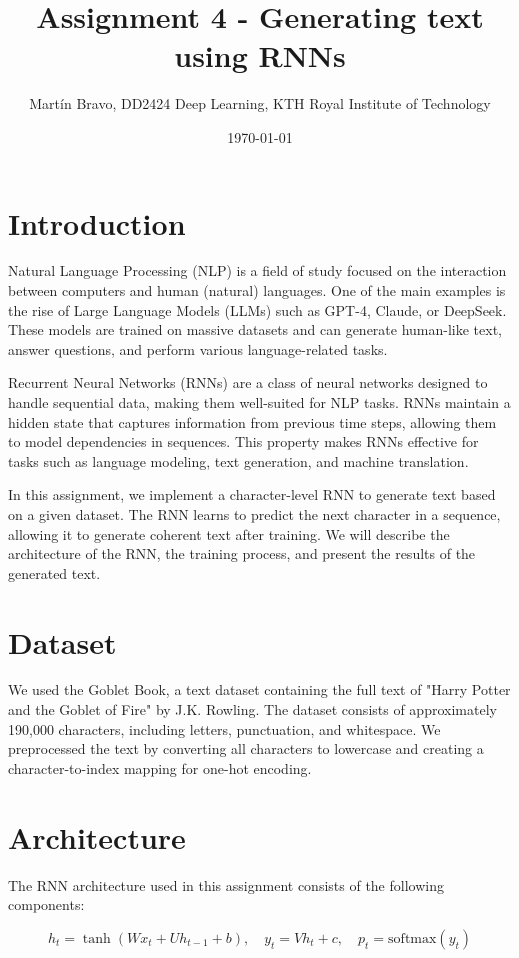 \documentclass{article}
\title{Assignment 4 - Generating text using RNNs}
\author{Martín Bravo, DD2424 Deep Learning, KTH Royal Institute of Technology}
\date{\today}
\begin{document}
\maketitle
\section{Introduction}

Natural Language Processing (NLP) is a field of study focused on the interaction between computers and human (natural) languages. One of the main examples is the rise of Large Language Models (LLMs) such as GPT-4, Claude, or DeepSeek. These models are trained on massive datasets and can generate human-like text, answer questions, and perform various language-related tasks.

Recurrent Neural Networks (RNNs) are a class of neural networks designed to handle sequential data, making them well-suited for NLP tasks. RNNs maintain a hidden state that captures information from previous time steps, allowing them to model dependencies in sequences. This property makes RNNs effective for tasks such as language modeling, text generation, and machine translation.

In this assignment, we implement a character-level RNN to generate text based on a given dataset. The RNN learns to predict the next character in a sequence, allowing it to generate coherent text after training. We will describe the architecture of the RNN, the training process, and present the results of the generated text.

\section{Dataset}

We used the Goblet Book, a text dataset containing the full text of "Harry Potter and the Goblet of Fire" by J.K. Rowling. The dataset consists of approximately 190,000 characters, including letters, punctuation, and whitespace. We preprocessed the text by converting all characters to lowercase and creating a character-to-index mapping for one-hot encoding.


\section{Architecture}

The RNN architecture used in this assignment consists of the following components:

\begin{equation}
h_t = \tanh(W x_t + U h_{t-1} + b), \quad y_t = V h_t + c, \quad p_t = \text{softmax}(y_t)
\end{equation}
\end{document}
